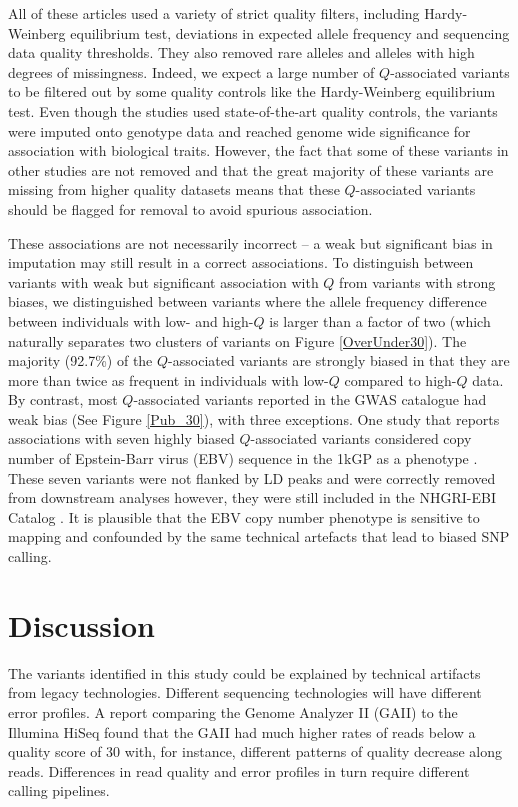\documentclass[9pt,article]{template}
\begin{document}
All of these articles used a variety of strict quality filters, including Hardy-Weinberg equilibrium test, deviations in expected allele frequency and sequencing data quality thresholds.
They also removed rare alleles and alleles with high degrees of missingness.
Indeed, we expect a large number of $Q$-associated variants to be filtered out by some quality controls like the Hardy-Weinberg equilibrium test.
Even though the studies used state-of-the-art quality controls, the variants were imputed onto genotype data and reached genome wide significance for association with biological traits.
However, the fact that some of these variants in other studies are not removed and that the great majority of these variants are missing from higher quality datasets means that these $Q$-associated variants should be flagged for removal to avoid spurious association.

These associations are not necessarily incorrect -- a weak but significant bias in imputation may still result in a correct associations.
To distinguish between variants with weak but significant association with $Q$ from variants with strong biases, we distinguished between variants where the allele frequency difference between individuals with low- and high-$Q$ is larger than a factor of two (which naturally separates two clusters of variants on Figure \ref{OverUnder30}).
The majority (92.7\%) of the $Q$-associated variants are strongly biased in that they are more than twice as frequent in individuals with low-$Q$ compared to high-$Q$ data.
By contrast, most $Q$-associated variants reported in the GWAS catalogue had weak bias (See Figure \ref{Pub_30}), with three exceptions.
One study that reports associations with seven highly biased $Q$-associated variants considered copy number of Epstein-Barr virus (EBV) sequence in the 1kGP as a phenotype \citep{Mandage2017}. 
These seven variants were not flanked by LD peaks and were correctly removed from downstream analyses however, they were still included in the NHGRI-EBI Catalog \citep{Mandage2017}.
It is plausible that the EBV copy number phenotype is sensitive to mapping and confounded by the same technical artefacts that lead to biased SNP calling.



\section{Discussion}

The variants identified in this study could be explained by technical artifacts from legacy technologies. %
Different sequencing technologies will have different error profiles. 
A report comparing the Genome Analyzer II (GAII) to the Illumina HiSeq found that the GAII had much higher rates of reads below a quality score of 30 \citep{Minoche2011} with, for instance, different patterns of quality decrease along reads. 
Differences in read quality and error profiles in turn require different calling pipelines.
\end{document}
